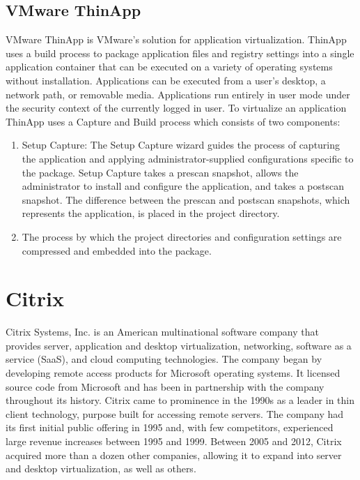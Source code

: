 \begin{enumerate}
\subsection{VMware ThinApp}
VMware ThinApp is VMware's solution for application virtualization. ThinApp uses a build process to package application files and registry settings into a single application container that can be executed on a variety of operating systems without installation. Applications can be executed from a user’s desktop, a network path, or removable media. Applications run entirely in user mode under the security context of the currently logged in user. To virtualize an application ThinApp uses a Capture and Build process which consists of two components:
\begin{enumerate}
\item Setup Capture: The Setup Capture wizard guides the process of capturing the application and applying administrator-supplied configurations specific to the package. Setup Capture takes a prescan snapshot, allows the administrator to install and configure the application, and takes a postscan snapshot. The difference between the prescan and postscan snapshots, which represents the application, is placed in the project directory.
\item The process by which the project directories and configuration settings are compressed and embedded into the package.
\end{enumerate}

\section{Citrix}
Citrix Systems, Inc. is an American multinational software company that provides server, application and desktop virtualization, networking, software as a service (SaaS), and cloud computing technologies. The company began by developing remote access products for Microsoft operating systems. It licensed source code from Microsoft and has been in partnership with the company throughout its history. Citrix came to prominence in the 1990s as a leader in thin client technology, purpose built for accessing remote servers. The company had its first initial public offering in 1995 and, with few competitors, experienced large revenue increases between 1995 and 1999. Between 2005 and 2012, Citrix acquired more than a dozen other companies, allowing it to expand into server and desktop virtualization, as well as others.


\end{enumerate}
